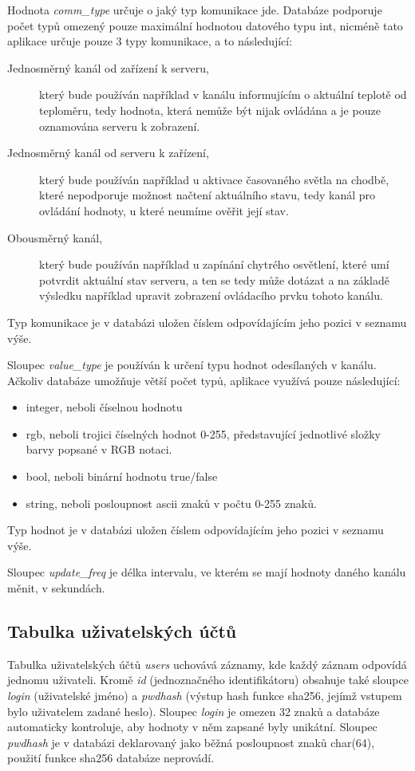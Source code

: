 Hodnota \emph{comm\_type} určuje o jaký typ komunikace jde. Databáze podporuje počet typů omezený pouze maximální hodnotou datového typu int, nicméně tato aplikace určuje pouze 3 typy komunikace, a to následující:
\begin{description}
    \item[Jednosměrný kanál od zařízení k serveru,] který bude používán například v kanálu informujícím o aktuální teplotě od teploměru, tedy hodnota, která nemůže být nijak ovládána a je pouze oznamována serveru k zobrazení.
    \item[Jednosměrný kanál od serveru k zařízení,] který bude používán například u aktivace časovaného světla na chodbě, které nepodporuje možnost načtení aktuálního stavu, tedy kanál pro ovládání hodnoty, u které neumíme ověřit její stav.
    \item[Obousměrný kanál,] který bude používán například u zapínání chytrého osvětlení, které umí potvrdit aktuální stav serveru, a ten se tedy může dotázat a na základě výsledku například upravit zobrazení ovládacího prvku tohoto kanálu.
\end{description}
Typ komunikace je v databázi uložen číslem odpovídajícím jeho pozici v seznamu výše.

Sloupec \emph{value\_type} je používán k určení typu hodnot odesílaných v kanálu. Ačkoliv databáze umožňuje větší počet typů, aplikace využívá pouze následující:
\begin{itemize}
    \item{integer}, neboli číselnou hodnotu
    \item{rgb}, neboli trojici číselných hodnot 0-255, představující jednotlivé složky barvy popsané v RGB notaci.
    \item{bool}, neboli binární hodnotu true/false
    \item{string}, neboli posloupnost \acrshort{ascii} znaků v počtu 0-255 znaků.
\end{itemize}
Typ hodnot je v databázi uložen číslem odpovídajícím jeho pozici v seznamu výše.

Sloupec \emph{update\_freq} je délka intervalu, ve kterém se mají hodnoty daného kanálu měnit, v sekundách.

\subsection{Tabulka uživatelských účtů}

Tabulka uživatelských účtů \emph{users} uchovává záznamy, kde každý záznam odpovídá jednomu uživateli. Kromě \emph{id} (jednoznačného identifikátoru) obsahuje také sloupce \emph{login} (uživatelské jméno) a \emph{pwdhash} (výstup hash funkce sha256, jejímž vstupem bylo uživatelem zadané heslo). Sloupec \emph{login} je omezen 32 znaků a databáze automaticky kontroluje, aby hodnoty v něm zapsané byly unikátní. Sloupec \emph{pwdhash} je v databázi deklarovaný jako běžná posloupnost znaků char(64), použití funkce sha256 databáze neprovádí.


